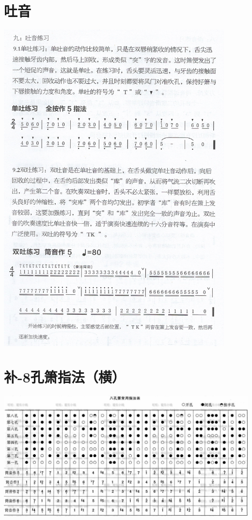 \documentclass[cn,pad,twocol]{elegantbook}
\begin{document}
\section{吐音}                  \includegraphics[width=0.9\textwidth]{dongxiao/Scan 15.jpeg}
\section{补-8孔箫指法（横）}    \center\includegraphics[width=0.94\textheight, angle=90]{dongxiao/20200817-8孔箫指法-横}
\end{document}
